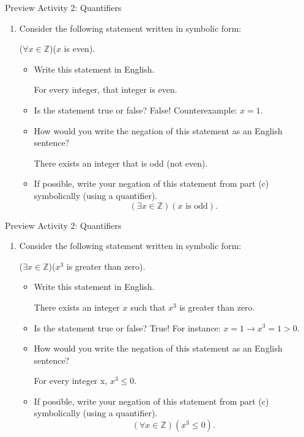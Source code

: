 \documentclass{beamer}
\begin{document}
\begin{frame}{Preview Activity 2: Quantifiers}
	\begin{enumerate}
		\item Consider the following statement written in symbolic form:
		\begin{center}
			($\forall x \in \mathbb{Z}$)($x$ is even).
		\end{center}
		\begin{itemize}
			\item[a.] Write this statement in English.\\ \pause
			\begin{center}
				For every integer, that integer is even.
			\end{center}
			\pause
			\item[b.] Is the statement true or false?  \pause False!  Counterexample: $x=1$. \pause
			\item[c.] How would you write the negation of this statement as an English sentence? \pause
			\begin{center}
				There exists an integer that is odd (not even).
			\end{center}
			\pause
			\item[d.] If possible, write your negation of this statement from part (c) symbolically
			(using a quantifier).\pause
			\[
			(\exists x \in \mathbb{Z})(x \text{ is odd}).
			\]
		\end{itemize}
	\end{enumerate}
\end{frame}

\begin{frame}{Preview Activity 2: Quantifiers}
	\begin{enumerate}
		\item[2.] Consider the following statement written in symbolic form:
		\begin{center}
			($\exists x \in \mathbb{Z}$)($x^3$ is greater than zero).
		\end{center}
		\begin{itemize}
			\item[a.] Write this statement in English.\\ \pause
			\begin{center}
				There exists an integer $x$ such that $x^3$ is greater than zero.
			\end{center}
			\pause
			\item[b.] Is the statement true or false?  \pause True!  For instance: $x=1 \to x^3 = 1 > 0$. \pause
			\item[c.] How would you write the negation of this statement as an English sentence? \pause
			\begin{center}
				For every integer x, $x^3 \leq 0$.
			\end{center}
			\pause
			\item[d.] If possible, write your negation of this statement from part (c) symbolically
			(using a quantifier).\pause
			\[
			(\forall x \in \mathbb{Z})(x^3 \leq 0).
			\]
		\end{itemize}
	\end{enumerate}
\end{frame}
\end{document}
